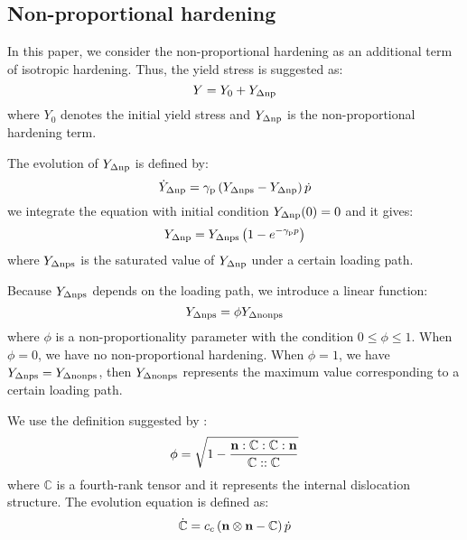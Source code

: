 \subsection{Non-proportional hardening}
\noindent
In this paper, we consider the non-proportional hardening as an additional term of isotropic hardening.
Thus, the yield stress is suggested as:
\begin{equation}
Y = {Y_0} + {Y_{\Delta \rm np}}
\end{equation}
where $Y_0$ denotes the initial yield stress and ${Y_{\Delta \rm np}}$ is the non-proportional hardening term.

The evolution of ${Y_{\Delta \rm np}}$ is defined by:
\begin{equation}
{\dot Y_{\Delta \rm np}} = {\gamma _{\rm p}}\left( {{Y_{\Delta \rm nps}} - {Y_{\Delta \rm np}}} \right)\dot p
\end{equation}
we integrate the equation with initial condition ${Y_{\Delta \rm np}}(0)=0$ and it gives:
\begin{equation}
{Y_{\Delta \rm np}} = Y_{\Delta \rm nps}\left( 1-e^{- \gamma_{\rm p} p} \right)
\end{equation}
where $Y_{\Delta \rm nps}$ is the saturated value of ${Y_{\Delta \rm np}}$ under a certain loading path.

Because ${Y_{\Delta \rm nps}}$ depends on the loading path, we introduce a linear function:
\begin{equation}
{Y_{\Delta \rm nps}} = \phi {Y_{\Delta \rm nonps}}
\end{equation}
where $\phi$ is a non-proportionality parameter with the condition $0 \leq \phi \leq 1$.
When $\phi = 0$, we have no non-proportional hardening.
When $\phi = 1$, we have ${Y_{\Delta \rm nps}} = {Y_{\Delta \rm nonps}}$, then ${Y_{\Delta \rm nonps}}$ represents the maximum value corresponding to a certain loading path.

We use the definition suggested by \cite{tanaka1994nonproportionality}:
\begin{equation}
\phi  = \sqrt {1 - \frac{{{\bf{n}}:\mathbb{C}:\mathbb{C}:{\bf{n}}}}{{\mathbb{C}::\mathbb{C}}}}
\end{equation}
where $\mathbb{C}$ is a fourth-rank tensor and it represents the internal dislocation structure.
The evolution equation is defined as:
\begin{equation}
\dot {\mathbb{C}} = {c_c}\left( {{\bf{n}} \otimes {\bf{n}} - \mathbb{C}} \right)\dot p
\end{equation}

